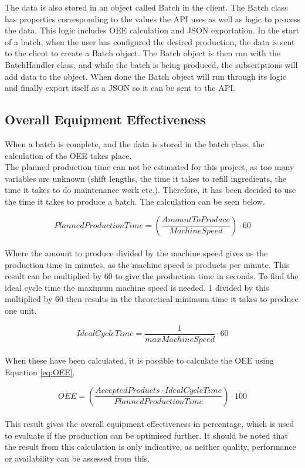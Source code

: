 The data is also stored in an object called Batch in the client. The Batch class
has properties corresponding to the values the API uses as well as logic to
process the data. This logic includes OEE calculation and JSON exportation. In
the start of a batch, when the user has configured the desired production, the
data is sent to the client to create a Batch object. The Batch object is then
run with the BatchHandler class, and while the batch is being produced, the
subscriptions will add data to the object. When done the Batch object will run
through its logic and finally export itself as a JSON so it can be sent to the
API. 


\subsection{Overall Equipment Effectiveness}
When a batch is complete, and the data is stored in the batch class, the
calculation of the OEE takes place.\\

The planned production time can not be estimated for this project, as too many
variables are unknown (shift lengths, the time it takes to refill ingredients,
the time it takes to do maintenance work etc.). Therefore, it has been decided
to use the time it takes to produce a batch. The calculation can be seen
below.

\[PlannedProductionTime = \left(\frac{AmountToProduce}{MachineSpeed}\right)\cdot60\]\\

Where the amount to produce divided by the machine speed gives us the production
time in minutes, as the machine speed is products per minute. This result can be
multiplied by 60 to give the production time in seconds. To find the ideal cycle
time the maximum machine speed is needed. 1 divided by this multiplied by 60
then results in the theoretical minimum time it takes to produce one unit.

\[IdealCycleTime = \frac{1}{maxMachineSpeed}\cdot60\]\\

When these have been calculated, it is possible to calculate the OEE using
Equation \ref{eq:OEE}.

\[OEE = \left(\frac{AcceptedProducts\cdot{IdealCycleTime}}{PlannedProductionTime}\right)\cdot100\]\\

This result gives the overall equipment effectiveness in percentage, which is
used to evaluate if the production can be optimised further. It should be noted
that the result from this calculation is only indicative, as neither quality,
performance or availability can be assessed from this.

